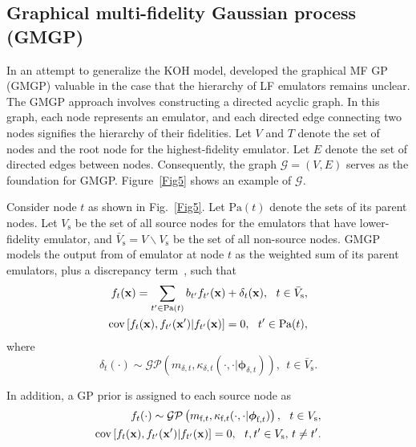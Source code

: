 \documentclass[iicol,sn-basic]{sn-jnl}%
\theoremstyle{thmstyleone}%
\theoremstyle{thmstyletwo}
\theoremstyle{thmstylethree}
\begin{document}
\begin{linenumbers}
\subsection{Graphical multi-fidelity Gaussian process (GMGP)}\label{Sec55}

In an attempt to generalize the KOH model, \cite{Ji2021} developed the graphical MF GP (GMGP) valuable in the case that the hierarchy of LF emulators remains unclear.
The GMGP approach involves constructing a directed acyclic graph.
In this graph, each node represents an emulator, and each directed edge connecting two nodes signifies the hierarchy of their fidelities. 
Let $V$ and $T$ denote the set of nodes and the root node for the highest-fidelity emulator.
Let $E$ denote the set of directed edges between nodes.
Consequently, the graph $\mathcal{G}=(V,E)$ serves as the foundation for GMGP.
Figure~\ref{Fig5} shows an example of $\mathcal{G}$.

Consider node $t$ as shown in Fig.~\ref{Fig5}.
Let $\text{Pa}(t)$ denote the sets of its parent nodes.
Let $V_\text{s}$ be the set of all source nodes for the emulators that have lower-fidelity emulator, and $\bar{V}_\text{s} = V \backslash V_\text{s}$ be the set of all non-source nodes.
GMGP models the output from of emulator at node $t$ as the weighted sum of its parent emulators, plus a discrepancy term~\citep{Ji2021}, such that
\begin{subequations}\label{Eq30}
	\begin{align}
		f_t({\bf x}) = \sum_{t' \in \text{Pa}(t)}
		b_{t'} f_{t'}({\bf x}) + \delta_{t}({\bf x}), \ \  t \in \bar{V}_\text{s}
		\label{Eq30-1},\\
		\text{cov}\left[f_{t}({\bf x}),f_{t'}({\bf x}')|f_{t'}({\bf x})\right]=0, \ \ t' \in  \text{Pa}(t)
		\label{Eq30-2},
	\end{align}
\end{subequations}
where
\begin{equation}\label{Eq31}
	\delta_{t}(\cdot) \sim \mathcal{GP}\left(m_{\delta,t},\kappa_{\delta,t}(\cdot,\cdot|{\boldsymbol \phi}_{\delta,t})\right), \ \ t \in \bar{V}_\text{s}.
\end{equation}

In addition, a GP prior is assigned to each source node as
\begin{subequations}\label{Eq32}
	\begin{align}
		f_{t}(\cdot) \sim \mathcal{GP}\left(m_{\text{f},t},\kappa_{\text{f},t}(\cdot,\cdot|{\boldsymbol \phi}_{\text{f},t})\right), \ \ t \in V_\text{s}
		\label{Eq32-1},\\
		\text{cov}\left[f_{t}({\bf x}),f_{t'}({\bf x}')|f_{t'}({\bf x})\right]=0, \ \ t,t' \in  V_\text{s}, \, t \neq t'
		\label{Eq32-2}.
	\end{align}
\end{subequations}


\end{linenumbers}
\end{document}
